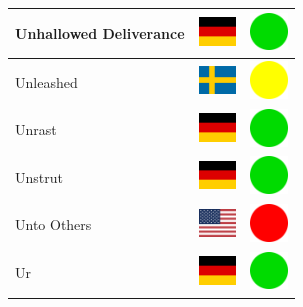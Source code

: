 \documentclass[12pt, a4paper, twoside]{report}
\begin{document}
\begin{center}
\begin{longtable}{|p{5cm}|p{2cm}|p{2cm}|}
 Unhallowed Deliverance                                     & \includegraphics[width=1cm]{../img/flags/de} &   \includegraphics[width=1cm]{../likes/y} \\ \hline
 Unleashed                                                  & \includegraphics[width=1cm]{../img/flags/se} &   \includegraphics[width=1cm]{../likes/m} \\ \hline
 Unrast                                                     & \includegraphics[width=1cm]{../img/flags/de} &   \includegraphics[width=1cm]{../likes/y} \\ \hline
 Unstrut                                                    & \includegraphics[width=1cm]{../img/flags/de} &   \includegraphics[width=1cm]{../likes/y} \\ \hline
 Unto Others                                                & \includegraphics[width=1cm]{../img/flags/us} &   \includegraphics[width=1cm]{../likes/n} \\ \hline
 Ur                                                         & \includegraphics[width=1cm]{../img/flags/de} &   \includegraphics[width=1cm]{../likes/y} \\ \hline

\end{longtable}
\end{center}
\end{document}
